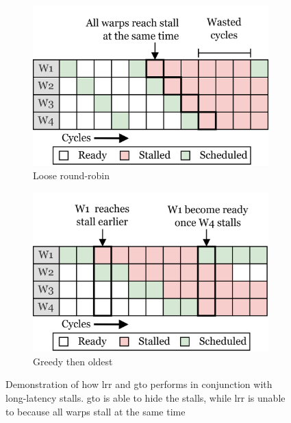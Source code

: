 \begin{figure}
     \centering
     \begin{subfigure}[b]{0.49\textwidth}
         \centering
         \includegraphics[width=\textwidth]{figures/warp-scheduling-lrr-stall-2.png}
         \caption{Loose round-robin}
         \label{fig:lrr-lls}
     \end{subfigure}
     \hfill
     \begin{subfigure}[b]{0.49\textwidth}
         \centering
         \includegraphics[width=\textwidth]{figures/warp-scheduling-gto-stall-2.png}
         \caption{Greedy then oldest}
         \label{fig:gto-lls}
     \end{subfigure}
        \caption[Demonstration of how \acrshort{lrr} and \acrshort{gto} handles long-latency stalls]{Demonstration of how \acrshort{lrr} and \acrshort{gto} performs in conjunction with long-latency stalls. \acrshort{gto} is able to hide the stalls, while \acrshort{lrr} is unable to because all warps stall at the same time}
        \label{fig:lrr-gto-lls}
\end{figure}

